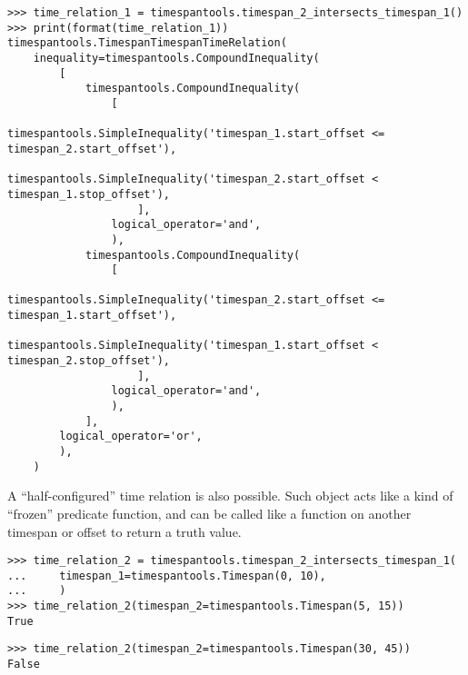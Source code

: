 \begin{singlespacing}
\vspace{-0.5\baselineskip}
\begin{lstlisting}
>>> time_relation_1 = timespantools.timespan_2_intersects_timespan_1()
>>> print(format(time_relation_1))
timespantools.TimespanTimespanTimeRelation(
    inequality=timespantools.CompoundInequality(
        [
            timespantools.CompoundInequality(
                [
                    timespantools.SimpleInequality('timespan_1.start_offset <= timespan_2.start_offset'),
                    timespantools.SimpleInequality('timespan_2.start_offset < timespan_1.stop_offset'),
                    ],
                logical_operator='and',
                ),
            timespantools.CompoundInequality(
                [
                    timespantools.SimpleInequality('timespan_2.start_offset <= timespan_1.start_offset'),
                    timespantools.SimpleInequality('timespan_1.start_offset < timespan_2.stop_offset'),
                    ],
                logical_operator='and',
                ),
            ],
        logical_operator='or',
        ),
    )
\end{lstlisting}
\end{singlespacing}

\noindent A \enquote{half-configured} time relation is also possible. Such
object acts like a kind of \enquote{frozen} predicate function, and can be
called like a function on another timespan or offset to return a truth value.

\begin{comment}
<abjad>
time_relation_2 = timespantools.timespan_2_intersects_timespan_1(
    timespan_1=timespantools.Timespan(0, 10),
    )
time_relation_2(timespan_2=timespantools.Timespan(5, 15))
time_relation_2(timespan_2=timespantools.Timespan(30, 45))
</abjad>
\end{comment}

\begin{singlespacing}
\vspace{-0.5\baselineskip}
\begin{lstlisting}
>>> time_relation_2 = timespantools.timespan_2_intersects_timespan_1(
...     timespan_1=timespantools.Timespan(0, 10),
...     )
>>> time_relation_2(timespan_2=timespantools.Timespan(5, 15))
True
\end{lstlisting}
\begin{lstlisting}
>>> time_relation_2(timespan_2=timespantools.Timespan(30, 45))
False
\end{lstlisting}
\end{singlespacing}

